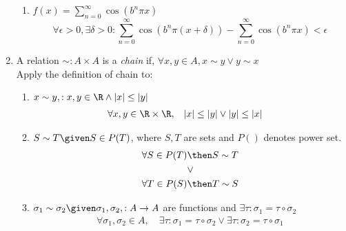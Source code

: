 \documentclass[basic, header]{nosvagor-notes}
\begin{document}
\begin{enumerate}[itemsep=5em]
\begin{enumerate}[itemsep=3em]
      \item \(\displaystyle f(x) = \sum_{n=0}^{\infty} \cos(b^n \pi x)\)
        \[%
          \forall \epsilon > 0, \exists \delta > 0 :
          \sum_{n=0}^{\infty} \cos (b^n \pi (x+\delta)) -
          \sum_{n=0}^{\infty} \cos (b^n \pi x) < \epsilon
        \]%

    \end{enumerate}

  \newpage %

  \item A relation \(\sim : A \times A \) is a \textit{chain} if, \(\forall x,y \in A,
    x\sim y \lor y \sim x\) \\
    Apply the definition of chain to:

    \begin{enumerate}[itemsep=2em]

      \item \(x \sim y, : x,y \in \R \land |x| \leq |y|\)
        \begin{align*}
          \forall x,y \in \R \times \R, &\quad |x| \leq |y|
          \lor
          |y| \leq |x|
        \end{align*}

      \item \(S\sim T \given S \in P(T)\), where \(S,T\) are sets and \(P()\)
        denotes power set.
        \begin{align*}
          \forall S \in P(T) &\then S \sim T \\
            &\lor \\
          \forall T \in P(S) &\then T \sim S
        \end{align*}

      \item \(\sigma_1 \sim \sigma_2 \given \sigma_1, \sigma_2, : A\to A\) are
        functions and \(\exists \tau : \sigma_1 = \tau \circ \sigma_2 \)
        \begin{align*}
          \forall \sigma_1, \sigma_2 \in A, \quad \exists \tau :
          \sigma_1 = \tau \circ \sigma_2
          \lor
          \exists \tau : \sigma_2 = \tau \circ \sigma_1
        \end{align*}

    \end{enumerate}


\end{enumerate}
\end{document}
